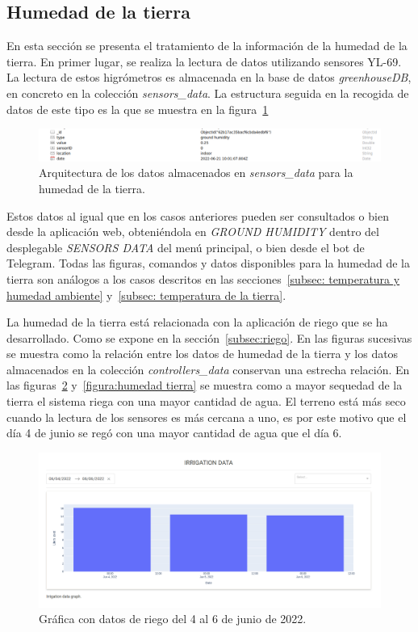 \documentclass[a4paper, 12pt, oneside]{book}
\begin{document}
\subsection{Humedad de la tierra}
\label{subsec: humedad de la tierra}
En esta sección se presenta el tratamiento de la información de la humedad de la tierra. En primer lugar, se realiza la lectura de datos utilizando sensores YL-69. La lectura de estos higrómetros es almacenada en la base de datos \textit{greenhouseDB}, en concreto en la colección \textit{sensors\_data}. La estructura seguida en la recogida de datos de este tipo es la que se muestra en la figura~\ref{figura:arquitectura_humedad_tierra}

\begin{figure}[H]
	\centering
    \includegraphics[width=12cm, keepaspectratio]{img/arquitectura_humedad_tierra}
    \caption{Arquitectura de los datos almacenados en \textit{sensors\_data} para la humedad de la tierra.}
    \label{figura:arquitectura_humedad_tierra}
\end{figure}

Estos datos al igual que en los casos anteriores pueden ser consultados o bien desde la aplicación web, obteniéndola en \textit{GROUND HUMIDITY} dentro del desplegable \textit{SENSORS DATA} del menú principal, o bien desde el bot de Telegram. Todas las figuras, comandos y datos disponibles para la humedad de la tierra son análogos a los casos descritos en las secciones~\ref{subsec: temperatura y humedad ambiente} y~\ref{subsec: temperatura de la tierra}.

La humedad de la tierra está relacionada con la aplicación de riego que se ha desarrollado. Como se expone en la sección~\ref{subsec:riego}. En las figuras sucesivas se muestra como la relación entre los datos de humedad de la tierra y los datos almacenados en la colección \textit{controllers\_data} conservan una estrecha relación.
En las figuras~\ref{figura:figura riego} y~\ref{figura:humedad tierra} se muestra como a mayor sequedad de la tierra el sistema riega con una mayor cantidad de agua. El terreno está más seco cuando la lectura de los sensores es más cercana a uno, es por este motivo que el día 4 de junio se regó con una mayor cantidad de agua que el día 6.

\begin{figure}[H]
	\centering
    \includegraphics[width=12cm, keepaspectratio]{img/figura_riego}
    \caption{Gráfica con datos de riego del 4 al 6 de junio de 2022.}
    \label{figura:figura riego}
\end{figure}
\end{document}
